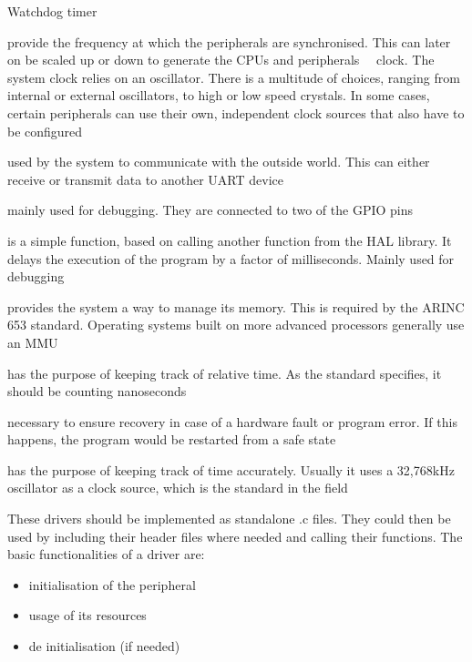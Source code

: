 \begin{labeling}{Watchdog timer}
	\item [\textbf{System Clock}] provide the frequency at which the
	peripherals are synchronised. This can later on be scaled up or down
	to generate the CPU\textquotesingle s and peripherals\textquotesingle
	\ \ clock.
	The system clock relies on an oscillator.
	There is a multitude of choices, ranging from internal or external
	oscillators, to high or low speed crystals. In some cases, certain
	peripherals can use their own, independent clock sources that also have
	to be configured
	\item [\textbf{UART}] used by the system to communicate with the outside
	world. This can either receive or transmit data to another UART device
	\item [\textbf{LEDs}] mainly used for debugging. They are
	connected to two of the GPIO pins
	\item [\textbf{Delay}] is a simple function, based on calling another
	function from the HAL library. It delays the execution 
	of the program by a factor of milliseconds. Mainly used for debugging
	\item [\textbf{MPU}] provides the system a way to manage its
	memory. This is required by the ARINC 653 standard. 
	Operating systems built on more advanced processors generally use 
	an MMU
	\item [\textbf{Timing}] has the purpose of keeping track of 
	relative time. As the standard specifies, it should be counting 
	nanoseconds
	\item [\textbf{Watchdog timer}] necessary to ensure recovery
	in case of a hardware fault or program error. If this happens, the
	program would be restarted from a safe state
	\item [\textbf{RTC}] has the purpose of keeping track of 
	time accurately. Usually it uses  a 32,768kHz oscillator as a 
	clock source, which is the standard in the field
\end{labeling}

These drivers should be implemented as standalone .c files. They could then
be used by including their header files where needed and calling their
functions.
The basic functionalities of a driver are:
\begin{itemize}[noitemsep]
	\item initialisation of the peripheral
	\item usage of its resources
	\item de initialisation (if needed) 
\end{itemize}

